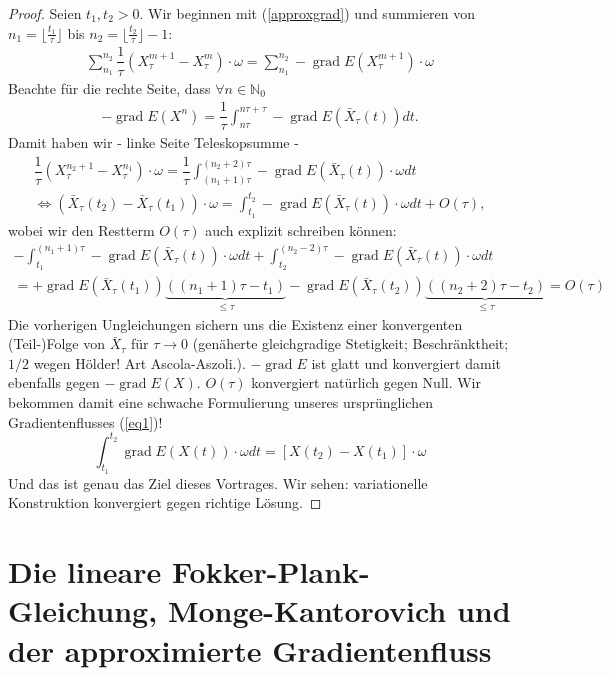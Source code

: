 \documentclass[11pt,a4paper,notitlepage]{scrreprt}
\newcommand{\NN}{\mathbb{N}}
\newcommand{\grad}{\operatorname{grad}}
\begin{document}
\begin{proof}
Seien $t_1,t_2>0$. Wir beginnen mit (\ref{approxgrad}) und summieren von $n_1=\lfloor\frac{t_1}{\tau}\rfloor$ bis $n_2=\lfloor\frac{t_2}{\tau}\rfloor-1$:\\
\begin{align}
\sum_{n_1}^{n_2}\dfrac{1}{\tau} (X_\tau^{m+1}-X_\tau^m)\cdot\omega=\sum_{n_1}^{n_2}-\grad E(X_\tau^{m+1})\cdot\omega
\end{align}
Beachte für die rechte Seite, dass $\forall n\in\NN_0$
\begin{align*}
-\grad E(X^n)=\dfrac{1}{\tau}\int_{n\tau}^{n\tau+\tau}-\grad E(\bar X_\tau(t))dt.
\end{align*}
Damit haben wir - linke Seite Teleskopsumme -
\begin{align}
\dfrac{1}{\tau}(X_\tau^{n_2+1}-X_\tau^{n_1})\cdot\omega=\dfrac{1}{\tau}\int_{(n_1+1)\tau}^{(n_2+2)\tau}-\grad E(\bar{X}_\tau(t))\cdot\omega dt\\
\Leftrightarrow (\bar{X}_\tau(t_2)-\bar{X}_\tau(t_1))\cdot\omega = \int_{t_1}^{t_2}-\grad E(\bar{X}_\tau(t))\cdot\omega dt+O(\tau),
\end{align}
wobei wir den Restterm $O(\tau)$ auch explizit schreiben können:
\begin{align*}
-\int_{t_1}^{(n_1+1)\tau}-\grad E(\bar X_\tau(t))\cdot\omega dt+\int_{t_2}^{(n_2-2)\tau}-\grad E(\bar X_\tau(t))\cdot\omega dt\\
=+\grad E(\bar X_\tau(t_1))\underset{\leq\tau}{\underbrace{((n_1+1)\tau-t_1)}}-\grad E(\bar X_\tau(t_2))\underset{\leq\tau}{\underbrace{((n_2+2)\tau-t_2)}}=O(\tau)
\end{align*}
Die vorherigen Ungleichungen sichern uns die Existenz einer konvergenten (Teil-)Folge von $\bar{X}_\tau$ für $\tau\to 0$ (genäherte gleichgradige Stetigkeit; Beschränktheit; $1/2$ wegen Hölder! Art Ascola-Aszoli.). $-\grad E$ ist glatt und konvergiert damit ebenfalls gegen $-\grad E(X)$. $O(\tau)$ konvergiert natürlich gegen Null. Wir bekommen damit eine schwache Formulierung unseres ursprünglichen Gradientenflusses (\ref{eq1})!
\begin{equation*}
\int_{t_1}^{t_2}\grad E(X(t))\cdot \omega dt = [X(t_2)-X(t_1)]\cdot\omega
\end{equation*}
Und das ist genau das Ziel dieses Vortrages. Wir sehen: variationelle Konstruktion konvergiert gegen richtige Lösung.  
\end{proof}

 

\newpage
\section{Die lineare Fokker-Plank-Gleichung, Monge-Kantorovich und der approximierte Gradientenfluss}
\end{document}
